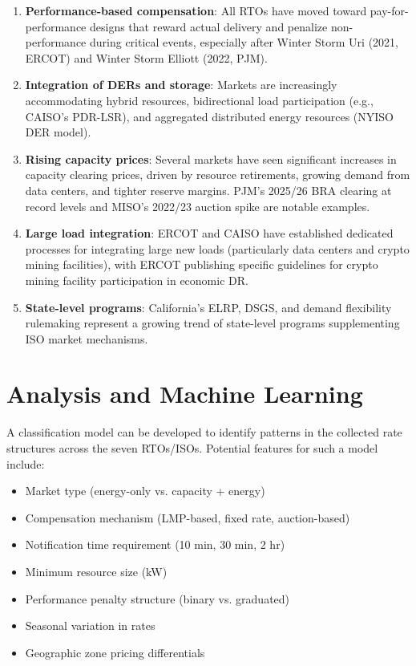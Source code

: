 \documentclass[12pt]{article}
\begin{document}
\begin{enumerate}
    \item \textbf{Performance-based compensation}: All RTOs have moved toward pay-for-performance designs that reward actual delivery and penalize non-performance during critical events, especially after Winter Storm Uri (2021, ERCOT) and Winter Storm Elliott (2022, PJM).

    \item \textbf{Integration of DERs and storage}: Markets are increasingly accommodating hybrid resources, bidirectional load participation (e.g., CAISO's PDR-LSR), and aggregated distributed energy resources (NYISO DER model).

    \item \textbf{Rising capacity prices}: Several markets have seen significant increases in capacity clearing prices, driven by resource retirements, growing demand from data centers, and tighter reserve margins. PJM's 2025/26 BRA clearing at record levels and MISO's 2022/23 auction spike are notable examples.

    \item \textbf{Large load integration}: ERCOT and CAISO have established dedicated processes for integrating large new loads (particularly data centers and crypto mining facilities), with ERCOT publishing specific guidelines for crypto mining facility participation in economic DR.

    \item \textbf{State-level programs}: California's ELRP, DSGS, and demand flexibility rulemaking represent a growing trend of state-level programs supplementing ISO market mechanisms.
\end{enumerate}

\section{Analysis and Machine Learning}

A classification model can be developed to identify patterns in the collected rate structures across the seven RTOs/ISOs. Potential features for such a model include:
\begin{itemize}
    \item Market type (energy-only vs. capacity + energy)
    \item Compensation mechanism (LMP-based, fixed rate, auction-based)
    \item Notification time requirement (10 min, 30 min, 2 hr)
    \item Minimum resource size (kW)
    \item Performance penalty structure (binary vs. graduated)
    \item Seasonal variation in rates
    \item Geographic zone pricing differentials
\end{itemize}
\end{document}
